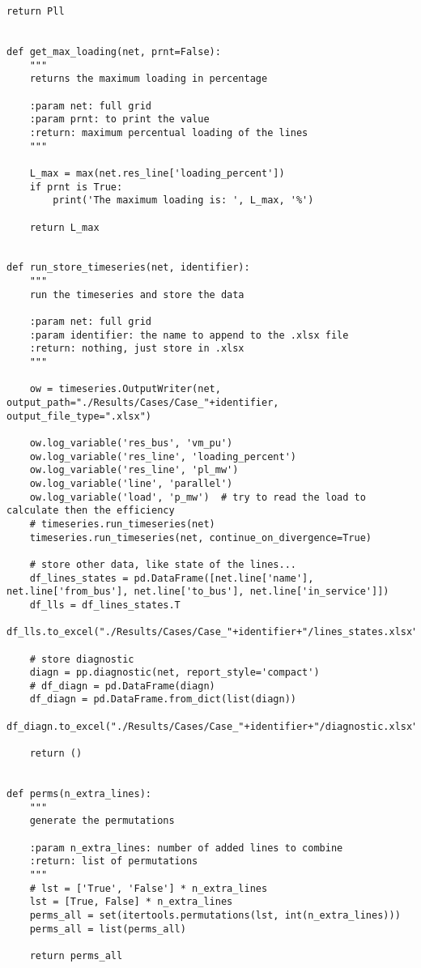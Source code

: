 \begin{lstlisting}[caption={Main code in Python with the Pandapower library}]
    return Pll


def get_max_loading(net, prnt=False):
    """
    returns the maximum loading in percentage

    :param net: full grid
    :param prnt: to print the value
    :return: maximum percentual loading of the lines
    """

    L_max = max(net.res_line['loading_percent'])
    if prnt is True:
        print('The maximum loading is: ', L_max, '%')

    return L_max


def run_store_timeseries(net, identifier):
    """
    run the timeseries and store the data

    :param net: full grid
    :param identifier: the name to append to the .xlsx file
    :return: nothing, just store in .xlsx
    """

    ow = timeseries.OutputWriter(net, output_path="./Results/Cases/Case_"+identifier, output_file_type=".xlsx")

    ow.log_variable('res_bus', 'vm_pu')
    ow.log_variable('res_line', 'loading_percent')
    ow.log_variable('res_line', 'pl_mw')
    ow.log_variable('line', 'parallel')
    ow.log_variable('load', 'p_mw')  # try to read the load to calculate then the efficiency
    # timeseries.run_timeseries(net)
    timeseries.run_timeseries(net, continue_on_divergence=True)

    # store other data, like state of the lines...
    df_lines_states = pd.DataFrame([net.line['name'], net.line['from_bus'], net.line['to_bus'], net.line['in_service']])
    df_lls = df_lines_states.T
    df_lls.to_excel("./Results/Cases/Case_"+identifier+"/lines_states.xlsx")

    # store diagnostic
    diagn = pp.diagnostic(net, report_style='compact')
    # df_diagn = pd.DataFrame(diagn)
    df_diagn = pd.DataFrame.from_dict(list(diagn))
    df_diagn.to_excel("./Results/Cases/Case_"+identifier+"/diagnostic.xlsx")

    return ()


def perms(n_extra_lines):
    """
    generate the permutations

    :param n_extra_lines: number of added lines to combine
    :return: list of permutations
    """
    # lst = ['True', 'False'] * n_extra_lines
    lst = [True, False] * n_extra_lines
    perms_all = set(itertools.permutations(lst, int(n_extra_lines)))
    perms_all = list(perms_all)

    return perms_all



\end{lstlisting}
